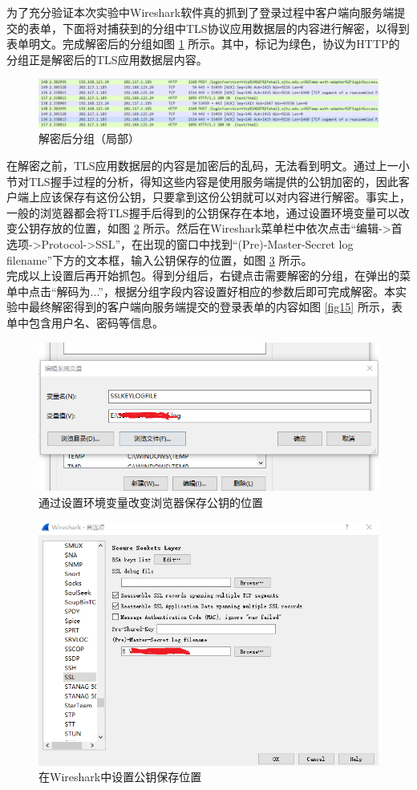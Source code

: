 \qquad
为了充分验证本次实验中Wireshark软件真的抓到了登录过程中客户端向服务端提交的表单，下面将对捕获到的分组中TLS协议应用数据层的内容进行解密，以得到表单明文。完成解密后的分组如图 \ref{fig12} 所示。其中，标记为绿色，协议为HTTP的分组正是解密后的TLS应用数据层内容。\\
\begin{figure}
	\centering
	\includegraphics[width=12cm]{image/http-1}
	\caption{解密后分组（局部）}
	\label{fig12}
\end{figure}
\qquad
在解密之前，TLS应用数据层的内容是加密后的乱码，无法看到明文。通过上一小节对TLS握手过程的分析，得知这些内容是使用服务端提供的公钥加密的，因此客户端上应该保存有这份公钥，只要拿到这份公钥就可以对内容进行解密。事实上，一般的浏览器都会将TLS握手后得到的公钥保存在本地，通过设置环境变量可以改变公钥存放的位置，如图 \ref{fig13} 所示。然后在Wireshark菜单栏中依次点击“编辑->首选项->Protocol->SSL”，在出现的窗口中找到“(Pre)-Master-Secret log filename”下方的文本框，输入公钥保存的位置，如图 \ref{fig14} 所示。\\
\qquad
完成以上设置后再开始抓包。得到分组后，右键点击需要解密的分组，在弹出的菜单中点击“解码为...”，根据分组字段内容设置好相应的参数后即可完成解密。本实验中最终解密得到的客户端向服务端提交的登录表单的内容如图 \ref{fig15} 所示，表单中包含用户名、密码等信息。
\begin{figure}
	\centering
	\includegraphics[width=12cm]{image/SSHKEY}
	\caption{通过设置环境变量改变浏览器保存公钥的位置}
	\label{fig13}
\end{figure}
\begin{figure}
	\centering
	\includegraphics[width=12cm]{image/SSHKEY-1}
	\caption{在Wireshark中设置公钥保存位置}
	\label{fig14}
\end{figure}
